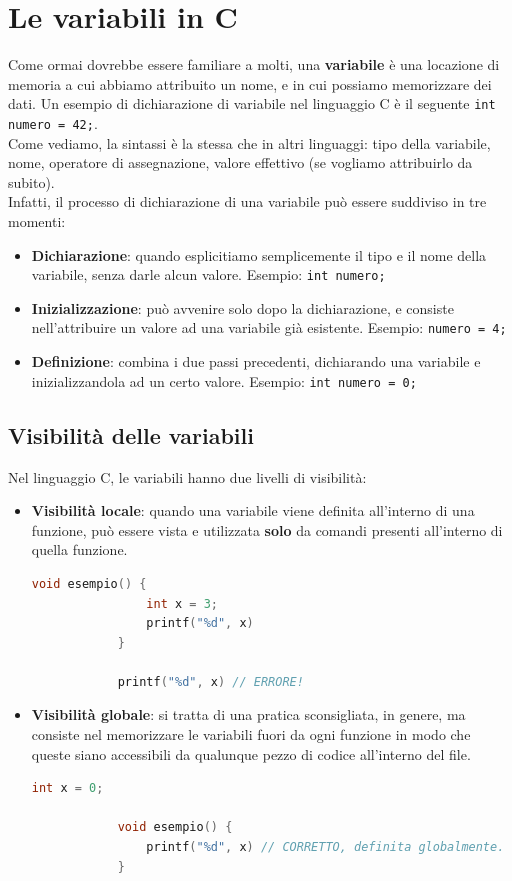 \documentclass[12pt]{report}
\begin{document}
	\section{Le variabili in C}
	Come ormai dovrebbe essere familiare a molti, una \textbf{variabile} è una locazione di memoria a cui abbiamo attribuito un nome, e in cui possiamo memorizzare dei dati.
	Un esempio di dichiarazione di variabile nel linguaggio C è il seguente \texttt{int numero = 42;}.\\
	\smallbreak
	Come vediamo, la sintassi è la stessa che in altri linguaggi: tipo della variabile, nome, operatore di assegnazione, valore effettivo (se vogliamo attribuirlo da subito).\\
	Infatti, il processo di dichiarazione di una variabile può essere suddiviso in tre momenti:
	\begin{itemize}
		\item \textbf{Dichiarazione}: quando esplicitiamo semplicemente il tipo e il nome della variabile, senza darle alcun valore. Esempio: \texttt{int numero;}
		
		\item \textbf{Inizializzazione}: può avvenire solo dopo la dichiarazione, e consiste nell'attribuire un valore ad una variabile già esistente. Esempio: \texttt{numero = 4;}
		
		\item \textbf{Definizione}: combina i due passi precedenti, dichiarando una variabile e inizializzandola ad un certo valore. Esempio: \texttt{int numero = 0;}
	\end{itemize}
	
	\subsection{Visibilità delle variabili}
	Nel linguaggio C, le variabili hanno due livelli di visibilità:
	\begin{itemize}
		\item \textbf{Visibilità locale}: quando una variabile viene definita all'interno di una funzione, può essere vista e utilizzata \textbf{solo} da comandi presenti all'interno di quella funzione.
		\begin{lstlisting}[language=C]
			void esempio() {
				int x = 3;
				printf("%d", x)
			}
			
			printf("%d", x) // ERRORE!
		\end{lstlisting} 
		
		\item \textbf{Visibilità globale}: si tratta di una pratica sconsigliata, in genere, ma consiste nel memorizzare le variabili fuori da ogni funzione in modo che queste siano accessibili da qualunque pezzo di codice all'interno del file.
		
		\begin{lstlisting}[language=C]
			int x = 0;
			
			void esempio() {
				printf("%d", x) // CORRETTO, definita globalmente.
			}
		\end{lstlisting}
	\end{itemize}
	
\end{document}
